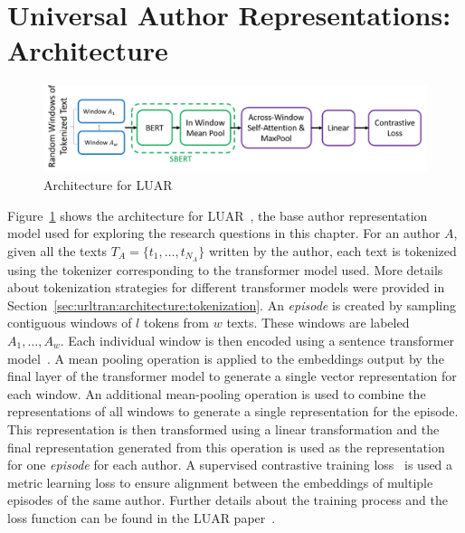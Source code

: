 \section{Universal Author Representations: Architecture}
\label{chp:stylometry_extensions:architecture}

\begin{figure}
    \centering
    \includegraphics[width=\linewidth]{stylometryExtensions/figures/LUAR.pdf}
    \caption{Architecture for LUAR~\citep{riverastao2021learning}}
    \label{fig:stylometry_extensions:followingTrail:LUAR}
\end{figure}

Figure~\ref{fig:stylometry_extensions:followingTrail:LUAR} shows the architecture for LUAR~\citep{riverastao2021learning}, the base author representation model used for exploring the research questions in this chapter. 
For an author $A$, given all the texts $T_A = \{t_1, \dots, t_{N_A}\}$ written by the author, each text is tokenized using the tokenizer corresponding to the transformer model used.
More details about tokenization strategies for different transformer models were provided in Section~\ref{sec:urltran:architecture:tokenization}.
An \textit{episode} is created by sampling contiguous windows of $l$ tokens from $w$ texts.
These windows are labeled $A_1, \dots, A_w$.
Each individual window is then encoded using a sentence transformer model~\citep{reimers2019sentencebert}.
A mean pooling operation is applied to the embeddings output by the final layer of the transformer model to generate a single vector representation for each window.
An additional mean-pooling operation is used to combine the representations of all windows to generate a single representation for the episode.
This representation is then transformed using a linear transformation and the final representation generated from this operation is used as the representation for one \textit{episode} for each author.
A supervised contrastive training loss~\cite{khosla2020supervised} is used a metric learning loss to ensure alignment between the embeddings of multiple episodes of the same author.
Further details about the training process and the loss function can be found in the LUAR paper~\citep{riverastao2021learning}.